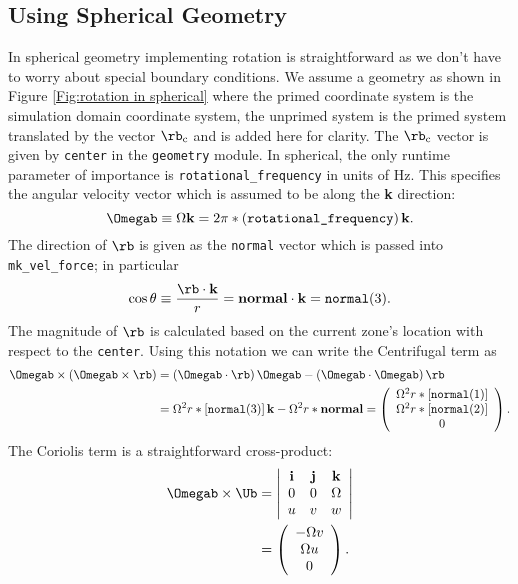 \subsection{Using Spherical Geometry}\label{Sec:Using Spherical Geometry}
In spherical geometry implementing rotation is straightforward as we don't have
to worry about special boundary conditions.  We assume a geometry as shown in
Figure \ref{Fig:rotation in spherical} where the primed coordinate system is 
the simulation domain coordinate system, the unprimed system is the primed 
system translated by the vector $\rb_\text{c}$ and is added here for
clarity.  The  $\rb_\text{c}$ vector is given by {\tt center} in the 
{\tt geometry} module.  In spherical, the only runtime parameter of importance
is {\tt rotational\_frequency} in units of Hz.  This specifies the angular 
velocity vector which is assumed to be along the {\bf k} direction:
\[
\Omegab \equiv \Omega \text{\bf k} = 2\pi *
\left(\text{\tt rotational\_frequency}\right)\text{\bf k}.
\]
The direction of $\rb$ is given as the {\tt normal} vector which is 
passed into {\tt mk\_vel\_force}; in particular
\[
\cos\theta \equiv \frac{\rb\cdot\text{\bf k}}{r} = 
\text{\bf normal}\cdot\text{\bf k} = \text{\tt normal}(3).
\]
The magnitude of $\rb$ is calculated based on the current zone's location with
respect to the {\tt center}.
Using this notation we can write the Centrifugal term as
\begin{align*}
\Omegab\times\left(\Omegab\times\rb\right) &=
\left(\Omegab\cdot\rb\right)\Omegab - \left(\Omegab\cdot\Omegab\right)\rb\\
&= \Omega^2 r *\left[\text{\tt normal}(3)\right]\text{\bf k} -
\Omega^2 r *\text{\bf normal} = \left(
\begin{array}{c}
\Omega^2r*\left[\text{\tt normal}(1)\right]\\
\Omega^2r*\left[\text{\tt normal}(2)\right]\\
0 \end{array}\right).
\end{align*}
The Coriolis term is a straightforward cross-product:
\begin{align*}
\Omegab \times \Ub &= \left|
\begin{array}{ccc}
  \text{\bf{i}}&\text{\bf{j}}&\text{\bf{k}}\\
  0 & 0 & \Omega\\
  u & v & w
\end{array}\right|\\
&= \left(
\begin{array}{c}
-\Omega v\\ \Omega u \\ 0
\end{array}
\right).
\end{align*}

